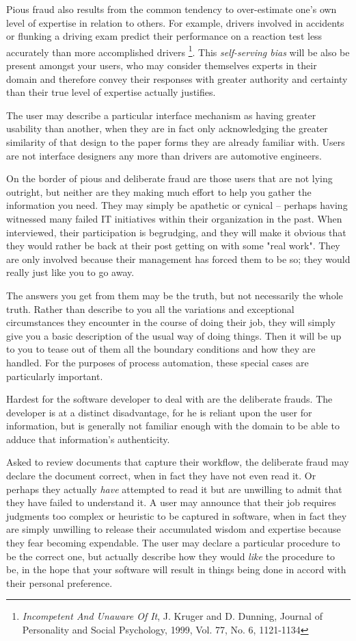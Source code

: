 \documentclass{article}
\begin{document}
\begin{enumerate}
Pious fraud also results from the common tendency to over-estimate one's
own level of expertise in relation to others. For example, drivers
involved in accidents or flunking a driving exam predict their
performance on a reaction test less accurately than more accomplished
drivers \footnote{\emph{Incompetent And Unaware Of It}, J. Kruger and D. Dunning, Journal
of Personality and Social Psychology, 1999, Vol. 77, No. 6,
1121-1134}. This \emph{self-serving bias} will be also be present amongst
your users, who may consider themselves experts in their domain and
therefore convey their responses with greater authority and certainty
than their true level of expertise actually justifies.

The user may describe a particular interface mechanism as having greater
usability than another, when they are in fact only acknowledging the
greater similarity of that design to the paper forms they are already
familiar with. Users are not interface designers any more than drivers
are automotive engineers.

On the border of pious and deliberate fraud are those users that are not
lying outright, but neither are they making much effort to help you
gather the information you need. They may simply be apathetic or cynical
-- perhaps having witnessed many failed IT initiatives within their
organization in the past. When interviewed, their participation is
begrudging, and they will make it obvious that they would rather be back
at their post getting on with some "real work". They are only involved
because their management has forced them to be so; they would really
just like you to go away.

The answers you get from them may be the truth, but not necessarily the
whole truth. Rather than describe to you all the variations and
exceptional circumstances they encounter in the course of doing their
job, they will simply give you a basic description of the usual way of
doing things. Then it will be up to you to tease out of them all the
boundary conditions and how they are handled. For the purposes of
process automation, these special cases are particularly important.

Hardest for the software developer to deal with are the deliberate
frauds. The developer is at a distinct disadvantage, for he is reliant
upon the user for information, but is generally not familiar enough with
the domain to be able to adduce that information's authenticity.

Asked to review documents that capture their workflow, the deliberate
fraud may declare the document correct, when in fact they have not even
read it. Or perhaps they actually \emph{have} attempted to read it but are
unwilling to admit that they have failed to understand it. A user may
announce that their job requires judgments too complex or heuristic to
be captured in software, when in fact they are simply unwilling to
release their accumulated wisdom and expertise because they fear
becoming expendable. The user may declare a particular procedure to be
the correct one, but actually describe how they would \emph{like} the
procedure to be, in the hope that your software will result in things
being done in accord with their personal preference.


\end{enumerate}
\end{document}
